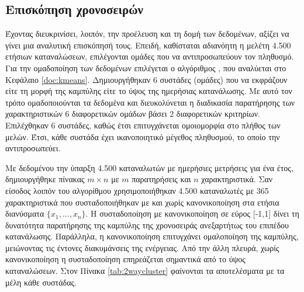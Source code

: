 \subsection{Επισκόπηση χρονοσειρών}
Έχοντας διευκρινίσει, λοιπόν, την προέλευση και τη δομή των δεδομένων, αξίζει να γίνει μια αναλυτική επισκόπησή τους. Επειδή, καθίσταται αδιανόητη η μελέτη 4.500 ετήσιων καταναλώσεων, επιλέγονται ομάδες που να αντιπροσωπεύουν τον πληθυσμό. Για την ομαδοποίηση των δεδομένων επιλέγεται ο αλγόριθμος , που αναλύεται στο Κεφάλαιο \ref{doc:kmeans}. Δημιουργήθηκαν 6 συστάδες (ομάδες) που να εκφράζουν είτε τη μορφή της καμπύλης είτε το ύψος της ημερήσιας κατανάλωσης. Με αυτό τον τρόπο ομαδοποιούνται τα δεδομένα και διευκολύνεται η διαδικασία παρατήρησης των χαρακτηριστικών 6 διαφορετικών ομάδων βάσει 2 διαφορετικών κριτηρίων. Επιλέχθηκαν 6 συστάδες, καθώς έτσι επιτυγχάνεται ομοιομορφία στο πλήθος των μελών. Έτσι, κάθε συστάδα έχει ικανοποιητικό μέγεθος πληθυσμού, το οποίο την αντιπροσωπεύει.\par
Με δεδομένου την ύπαρξη 4.500 καταναλωτών με ημερήσιες μετρήσεις για ένα έτος, δημιουργήθηκε πίνακας $m \times n$ με $m$ παρατηρήσεις και $n$ χαρακτηριστικά. Σαν είσοδος λοιπόν του αλγορίθμου  χρησιμοποιήθηκαν 4.500 καταναλωτές με 365 χαρακτηριστικά που συσταδοποιήθηκαν με και χωρίς κανονικοποίηση στα ετήσια διανύσματα $\{x_{1}, ..., x_{n}\}$. Η συσταδοποίηση με κανονικοποίηση σε εύρος [-1,1] δίνει τη δυνατότητα παρατήρησης της καμπύλης της χρονοσειράς ανεξαρτήτως του επιπέδου κατανάλωσης. Παράλληλα, η κανονικοποίηση επιτυγχάνει ομαλοποίηση της καμπύλης, μειώνοντας τις έντονες διακυμάνσεις της ενέργειας.  Από την άλλη πλευρά, χωρίς κανονικοποίηση η συσταδοποίηση επηρεάζεται σημαντικά από το ύψος καταναλώσεων. Στον Πίνακα \ref{tab:2waycluster} φαίνονται τα αποτελέσματα με τα μέλη κάθε συστάδας.\par
